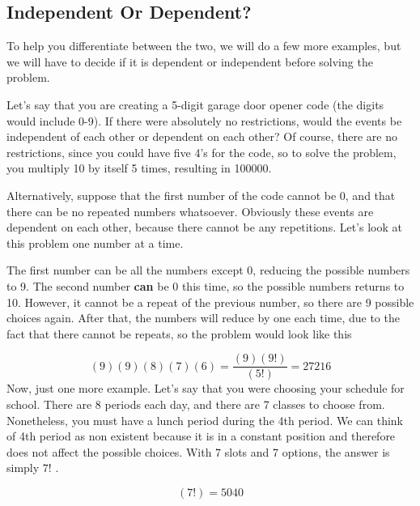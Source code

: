 \subsection{Independent Or Dependent?}
\label{sss:inde-df5c}




To help you differentiate between the two, we will do a few more examples, but we will
have to decide if it is dependent or independent before solving the problem.



Let's say that you are creating a 5-digit garage door opener code (the digits would
include 0-9). If there were absolutely no restrictions, would the events be independent of
each other or dependent on each other? Of course, there are no restrictions, since you
could have five 4's for the code, so to solve the problem, you multiply 10 by itself 5
times, resulting in 100000.



Alternatively, suppose that the first number of the code cannot be 0, and that there can
be no repeated numbers whatsoever. Obviously these events are dependent on each other,
because there cannot be any repetitions. Let's look at this problem one number at a time.



The first number can be all the numbers except 0, reducing the possible numbers to 9. The
second number \textbf{can} be 0 this time, so the possible numbers returns to 10. However,
it cannot be a repeat of the previous number, so there are 9 possible choices again. After
that, the numbers will reduce by one each time, due to the fact that there cannot be
repeats, so the problem would look like this



$$(9)(9)(8)(7)(6)=\frac{(9)(9!)}{(5!)}=27216$$ Now, just one more example. Let's say that
you were choosing your schedule for school. There are 8 periods each day, and there are 7
classes to choose from. Nonetheless, you must have a lunch period during the 4th period.
We can think of 4th period as non existent because it is in a constant position and
therefore does not affect the possible choices. With 7 slots and 7 options, the answer is
simply $7!$ .



$$(7!)=5040$$




